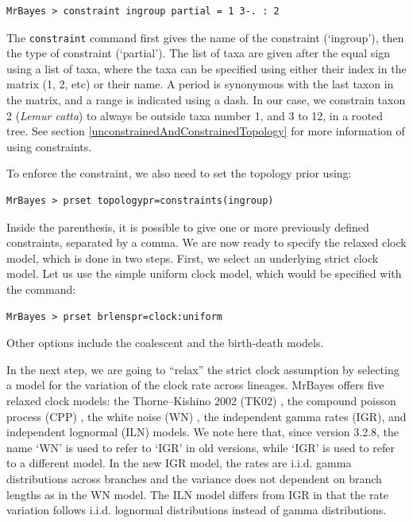 \documentclass[12pt]{book}
\begin{document}
\begin{Verbatim}
MrBayes > constraint ingroup partial = 1 3-. : 2
\end{Verbatim}

The \texttt{constraint} command first gives the name of the constraint (`ingroup'), then the type
of constraint (`partial'). The list of taxa are given after the equal sign using a list of taxa,
where the taxa can be specified using either their index in the matrix (1, 2, etc) or their name. A
period is synonymous with the last taxon in the matrix, and a range is indicated using a dash. In
our case, we constrain taxon 2 (\textit{Lemur catta}) to always be outside taxa number 1, and 3 to
12, in a rooted tree. See section \ref{unconstrainedAndConstrainedTopology} for more information of
using constraints.

To enforce the constraint, we also need to set the topology prior using:

\begin{Verbatim}
MrBayes > prset topologypr=constraints(ingroup)
\end{Verbatim}

Inside the parenthesis, it is possible to give one or more previously defined constraints,
separated by a comma. We are now ready to specify the relaxed clock model, which is done in two
steps. First, we select an underlying strict clock model. Let us use the simple uniform clock
model, which would be specified with the command:

\begin{Verbatim}
MrBayes > prset brlenspr=clock:uniform
\end{Verbatim}

Other options include the coalescent and the birth-death models. 

In the next step, we are going to ``relax'' the strict clock assumption by selecting a model for
the variation of the clock rate across lineages. MrBayes offers five relaxed clock models: the
Thorne--Kishino 2002 (TK02) \citep{thorne02}, the compound poisson process (CPP)
\citep{huelsenbeck00a}, the white noise (WN) \citep{lepage07}, the independent gamma rates (IGR),
and independent lognormal (ILN) \citep{drummond06} models. We note here that, since version 3.2.8,
the name `WN' is used to refer to `IGR' in old versions, while `IGR' is used to refer to a
different model. In the new IGR model, the rates are i.i.d. gamma distributions across branches and
the variance does not dependent on branch lengths as in the WN model. The ILN model differs from
IGR in that the rate variation follows i.i.d. lognormal distributions instead of gamma
distributions.
\end{document}
